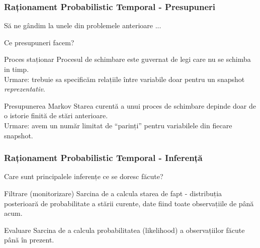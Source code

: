 \begin{frame}[t]
  \frametitle{Raționament Probabilistic Temporal - Presupuneri}
	Să ne gândim la unele din problemele anterioare ...	
	\vspace*{0.5em}
	\pause	
	
	Ce \alert{presupuneri} facem?
	\pause	
	
	\begin{block}{Proces staționar}
		Procesul de schimbare este guvernat de legi care \alert{nu se schimba in timp}.\\
		\alert{Urmare:} trebuie sa specificăm relațiile între variabile doar pentru un snapshot \emph{reprezentativ}.	
	\end{block}
	\pause	
	
	\begin{block}{Presupunerea Markov}
		Starea curentă a unui proces de schimbare depinde doar de o \alert{istorie finită} de stări anterioare.\\
		\alert{Urmare:} avem un număr \alert{limitat} de ``parinți'' pentru variabilele din fiecare snapshot.
	\end{block}
  
\end{frame}

\begin{frame}
  \frametitle{Raționament Probabilistic Temporal - Inferență}
	Care sunt principalele inferențe ce se doresc făcute?	
	\pause	
	
	\begin{block}{Filtrare (monitorizare)}
		\justifying
		Sarcina de a calcula \alert{starea de fapt} - distribuția posterioară de probabilitate a 
		\alert{stării curente}, date fiind toate observațiile de până acum.
	\end{block}
	\pause
	
	\begin{block}{Evaluare}
		\justifying		
		Sarcina de a calcula \alert{probabilitatea (likelihood)} a observațiilor făcute până în prezent.
	\end{block}  
\end{frame}


